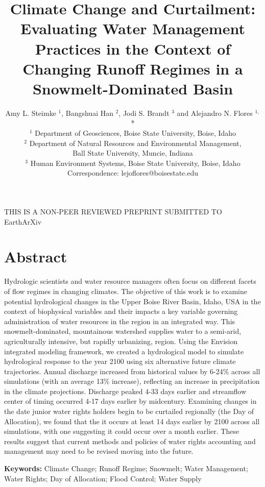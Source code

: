 \documentclass[11pt,letterpaper]{article}
\title{Climate Change and Curtailment: Evaluating Water Management Practices in the Context of Changing Runoff Regimes in a Snowmelt-Dominated Basin}
\author{Amy L. Steimke $^{1}$, Bangshuai Han $^{2}$, Jodi S. Brandt $^{3}$ and Alejandro N. Flores $^{1,}$* \\
$^{1}$ \quad Department of Geosciences, Boise State University, Boise, Idaho\\
$^{2}$ \quad Department of Natural Resources and Environmental Management,\\ Ball State University, Muncie, Indiana\\
$^{3}$ \quad Human Environment Systems, Boise State University, Boise, Idaho\\
Correspondence: lejoflores@boisestate.edu}
\begin{document}
\maketitle
\begin{center}
\MakeUppercase{This is a non-peer reviewed preprint submitted to} EarthArXiv
\end{center}

\linenumbers
{}

\section*{Abstract}
Hydrologic scientists and water resource managers often focus on different facets of flow regimes in changing climates. The objective of this work is to examine potential hydrological changes in the Upper Boise River Basin, Idaho, USA in the context of biophysical variables and their impacts a key variable governing administration of water resources in the region in an integrated way. This snowmelt-dominated, mountainous watershed supplies water to a semi-arid, agriculturally intensive, but rapidly urbanizing, region. Using the Envision integrated modeling framework, we created a hydrological model to simulate hydrological response to the year 2100 using six alternative future climate trajectories. Annual discharge increased from historical values by 6-24\% across all simulations (with an average 13\% increase), reflecting an increase in precipitation in the climate projections. Discharge peaked 4-33 days earlier and streamflow center of timing occurred 4-17 days earlier by midcentury. Examining changes in the date junior water rights holders begin to be curtailed regionally (the Day of Allocation), we found that the it occurs at least 14 days earlier by 2100 across all simulations, with one suggesting it could occur over a month earlier. These results suggest that current methods and policies of water rights accounting and management may need to be revised moving into the future.

\textbf{Keywords:} Climate Change; Runoff Regime; Snowmelt; Water Management; Water Rights; Day of Allocation; Flood Control; Water Supply


\end{document}
